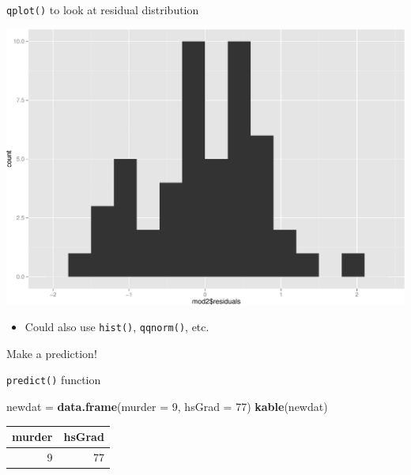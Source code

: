 \documentclass[ignorenonframetext,]{beamer}
\newenvironment{Shaded}{\begin{snugshade}}{\end{snugshade}}
\newcommand{\KeywordTok}[1]{\textcolor[rgb]{0.13,0.29,0.53}{\textbf{{#1}}}}
\newcommand{\DataTypeTok}[1]{\textcolor[rgb]{0.13,0.29,0.53}{{#1}}}
\newcommand{\DecValTok}[1]{\textcolor[rgb]{0.00,0.00,0.81}{{#1}}}
\newcommand{\StringTok}[1]{\textcolor[rgb]{0.31,0.60,0.02}{{#1}}}
\newcommand{\NormalTok}[1]{{#1}}
\begin{document}
\begin{frame}{\texttt{qplot()} to look at residual distribution}

\includegraphics{Regression_files/figure-beamer/unnamed-chunk-18-1.pdf}

\begin{itemize}[<+->]
\itemsep1pt\parskip0pt
\item
  Could also use \texttt{hist()}, \texttt{qqnorm()}, etc.
\end{itemize}

\end{frame}

\begin{frame}[fragile]{Make a prediction!}

\begin{block}{\texttt{predict()} function}

\begin{Shaded}
\begin{Highlighting}[]
\NormalTok{newdat =}\StringTok{ }\KeywordTok{data.frame}\NormalTok{(}\DataTypeTok{murder =} \DecValTok{9}\NormalTok{, }\DataTypeTok{hsGrad =} \DecValTok{77}\NormalTok{)}
\KeywordTok{kable}\NormalTok{(newdat)}
\end{Highlighting}
\end{Shaded}

\begin{longtable}[c]{@{}rr@{}}
\toprule
murder & hsGrad\tabularnewline
\midrule
\endhead
9 & 77\tabularnewline
\bottomrule
\end{longtable}

\end{block}

\end{frame}
\end{document}
